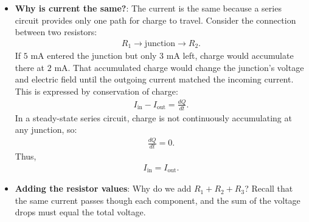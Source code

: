 \documentclass{report}
\begin{document}
\begin{itemize}
            \begin{align*}
                I_{\text{in}} - I_{\text{out}} = \frac{dQ_{\text{junction}}}{dt}
            .\end{align*}
            Suppose \(5\text{ mA}\) enters a junction while only \(3\text{ mA}\) exits. The remaining \(2\text{ mA}\) accumulates there:
            \bigbreak \noindent 
            Because \(1\text{ mA}=1\text{ millicoulomb per second}\), the junction would gain \(2\text{ millicoulombs}\) of charge every second.
            \bigbreak \noindent 
            However, charge accumulation changes the junction’s voltage. That voltage change alters the electric field and therefore the currents through the resistors. The adjustment continues until the outgoing current equals the incoming current:
            \begin{align*}
                I_{\text{in}} = I_{\text{out}}
            .\end{align*}
        \item \textbf{Why is current the same?}: The current is the same because a series circuit provides only one path for charge to travel.
            \bigbreak \noindent 
            Consider the connection between two resistors:
            \begin{align*}
                R_{1} \to \text{junction} \to R_{2}
            .\end{align*}
            If \(5\text{ mA}\) entered the junction but only \(3\text{ mA}\) left, charge would accumulate there at \(2\text{ mA}\). That accumulated charge would change the junction’s voltage and electric field until the outgoing current matched the incoming current.
            \bigbreak \noindent 
            This is expressed by conservation of charge:
            \begin{align*}
                I_{\text{in}} - I_{\text{out}} = \frac{dQ}{dt}
            .\end{align*}
            In a steady-state series circuit, charge is not continuously accumulating at any junction, so:
            \begin{align*}
                \frac{dQ}{dt} = 0
            .\end{align*}
            Thus,
            \begin{align*}
                I_{\text{in}} = I_{\text{out}}
            .\end{align*}
        \item \textbf{Adding the resistor values}: Why do we add $R_{1} + R_{2} + R_{3}$? Recall that the same current passes though each component, and the sum of the voltage drops must equal the total voltage.

\end{itemize}
\end{document}
